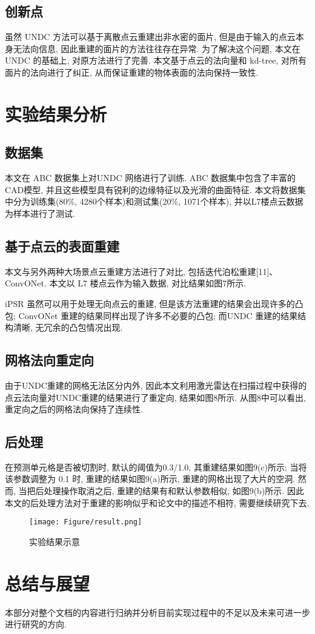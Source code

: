 \subsection{创新点}
虽然 UNDC 方法可以基于离散点云重建出非水密的面片, 但是由于输入的点云本身无法向信息, 因此重建的面片的方法往往存在异常. 为了解决这个问题, 本文在 UNDC 的基础上, 对原方法进行了完善. 本文基于点云的法向量和 kd-tree, 对所有面片的法向进行了纠正, 从而保证重建的物体表面的法向保持一致性. 
\section{实验结果分析}
\subsection{数据集}
本文在 ABC 数据集上对UNDC 网络进行了训练. ABC 数据集中包含了丰富的CAD模型, 并且这些模型具有锐利的边缘特征以及光滑的曲面特征. 本文将数据集中分为训练集(80\%, 4280个样本)和测试集(20\%, 1071个样本), 并以L7楼点云数据为样本进行了测试. 
\subsection{基于点云的表面重建}
本文与另外两种大场景点云重建方法进行了对比, 包括迭代泊松重建[11]、ConvONet. 本文以 L7 楼点云作为输入数据, 对比结果如图7所示. 

iPSR 虽然可以用于处理无向点云的重建, 但是该方法重建的结果会出现许多的凸包; ConvONet 重建的结果同样出现了许多不必要的凸包; 而UNDC 重建的结果结构清晰, 无冗余的凸包情况出现. 
\subsection{网格法向重定向}
由于UNDC重建的网格无法区分内外, 因此本文利用激光雷达在扫描过程中获得的点云法向量对UNDC重建的结果进行了重定向, 结果如图8所示. 从图8中可以看出, 重定向之后的网格法向保持了连续性. 


\subsection{后处理}
在预测单元格是否被切割时, 默认的阈值为0.3/1.0, 其重建结果如图9(c)所示; 当将该参数调整为 0.1 时, 重建的结果如图9(a)所示, 重建的网格出现了大片的空洞. 然而, 当把后处理操作取消之后, 重建的结果有和默认参数相似, 如图9(b)所示. 因此本文的后处理方法对于重建的影响似乎和论文中的描述不相符, 需要继续研究下去. 


\begin{figure}[H]
	\center
	\texttt{[image: Figure/result.png]}
	\centering
	\caption{实验结果示意}\label{fig:fig3}
\end{figure}

\section{总结与展望}
本部分对整个文档的内容进行归纳并分析目前实现过程中的不足以及未来可进一步进行研究的方向. 


\printbibliography%
